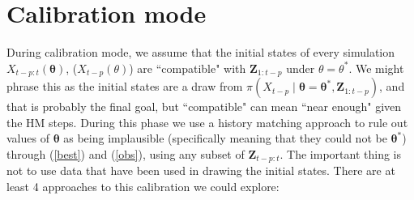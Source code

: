 \documentclass[a4paper]{article}
\newcommand{\btheta}{\bm{\theta}}
\newcommand{\bZ}{\bm{Z}}
\begin{document}
\section*{Calibration mode}
During calibration mode, we assume that the initial states of every simulation $X_{t-p:t}(\btheta)$, ($X_{t-p}(\theta)$) are ``compatible" with $\bZ_{1:t-p}$ under $\theta=\theta^*$. We might phrase this as the initial states are a draw from $\pi(X_{t-p} \mid \btheta=\btheta^*, \bZ_{1:t-p})$, and that is probably the final goal, but ``compatible" can mean ``near enough" given the HM steps. During this phase we use a history matching approach to rule out values of $\btheta$ as being implausible (specifically meaning that they could not be $\btheta^*$) through (\ref{best}) and (\ref{obs}), using any subset of $\bZ_{t-p:t}$. The important thing is not to use data that have been used in drawing the initial states. There are at least 4 approaches to this calibration we could explore: 
\end{document}
